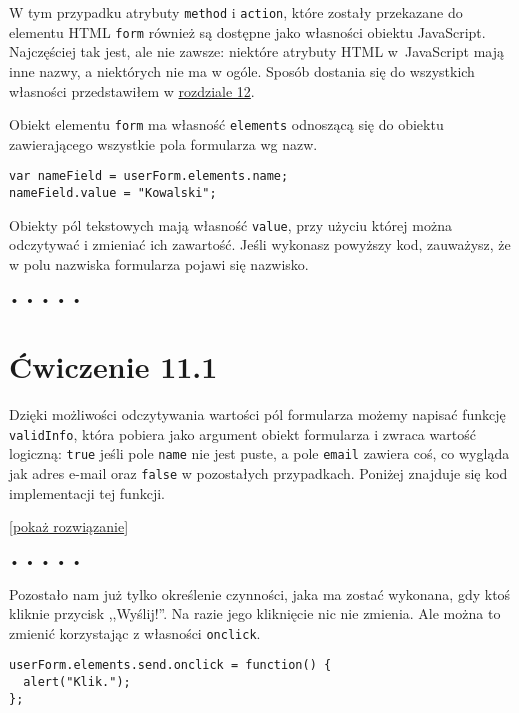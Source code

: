 W tym przypadku atrybuty \texttt{method} i \texttt{action}, które zostały przekazane do elementu HTML \texttt{form} również są dostępne jako własności obiektu JavaScript. Najczęściej tak jest, ale nie zawsze: niektóre atrybuty HTML w~JavaScript mają inne nazwy, a niektórych nie ma w ogóle. Sposób dostania się do wszystkich własności przedstawiłem w \hyperref[chap:12]{rozdziale 12}.

  
Obiekt elementu \texttt{form} ma własność \texttt{elements} odnoszącą się do obiektu zawierającego wszystkie pola formularza wg nazw.

  
\begin{verbatim} 
var nameField = userForm.elements.name;
nameField.value = "Kowalski";
\end{verbatim}
  
Obiekty pól tekstowych mają własność \texttt{value}, przy użyciu której można odczytywać i zmieniać ich zawartość. Jeśli wykonasz powyższy kod, zauważysz, że w polu nazwiska formularza pojawi się nazwisko.



\begin{center}
• • • • •
\end{center}

  
\section*{Ćwiczenie 11.1}
\label{sec:11.1}
  
    
Dzięki możliwości odczytywania wartości pól formularza możemy napisać funkcję \texttt{validInfo}, która pobiera jako argument obiekt formularza i zwraca wartość logiczną: \texttt{true} jeśli pole \texttt{name} nie jest puste, a pole \texttt{email} zawiera coś, co wygląda jak adres e-mail oraz \texttt{false} w pozostałych przypadkach. Poniżej znajduje się kod implementacji tej funkcji.

  
[\hyperref[sol:11.1]{pokaż rozwiązanie}]
  


\begin{center}
• • • • •
\end{center}

  
Pozostało nam już tylko określenie czynności, jaka ma zostać wykonana, gdy ktoś kliknie przycisk ,,Wyślij!''. Na razie jego kliknięcie nic nie zmienia. Ale można to zmienić korzystając z własności \texttt{onclick}.

  
\begin{verbatim} 
userForm.elements.send.onclick = function() {
  alert("Klik.");
};
\end{verbatim}
  
